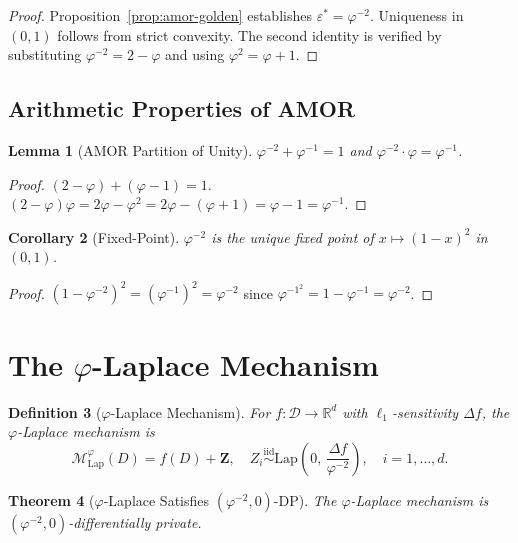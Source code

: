 \documentclass[12pt]{article}
\newtheorem{theorem}{Theorem}
\newtheorem{lemma}[theorem]{Lemma}
\newtheorem{corollary}[theorem]{Corollary}
\newtheorem{definition}[theorem]{Definition}
\newcommand{\AMOR}{\varphi^{-2}}
\newcommand{\PHI}{\varphi}
\newcommand{\PHIINV}{\varphi^{-1}}
\newcommand{\Lap}{\mathrm{Lap}}
\newcommand{\eps}{\varepsilon}
\newcommand{\Mech}{\mathcal{M}}
\newcommand{\DB}{\mathcal{D}}
\newcommand{\R}{\mathbb{R}}
\newcommand{\Sens}{\Delta}
\begin{document}
\begin{proof}
Proposition~\ref{prop:amor-golden} establishes $\eps^* = \AMOR$.  Uniqueness in
$(0,1)$ follows from strict convexity.  The second identity is verified by
substituting $\AMOR = 2 - \PHI$ and using $\PHI^2 = \PHI + 1$.
\end{proof}

\subsection{Arithmetic Properties of AMOR}

\begin{lemma}[AMOR Partition of Unity]
\label{lem:partition}
$\AMOR + \PHIINV = 1$ and $\AMOR \cdot \PHI = \PHIINV$.
\end{lemma}

\begin{proof}
$(2-\PHI) + (\PHI-1) = 1$.  $(2-\PHI)\PHI = 2\PHI - \PHI^2 = 2\PHI -
(\PHI+1) = \PHI - 1 = \PHIINV$.
\end{proof}

\begin{corollary}[Fixed-Point]
\label{cor:fixed}
$\AMOR$ is the unique fixed point of $x \mapsto (1-x)^2$ in $(0,1)$.
\end{corollary}

\begin{proof}
$(1-\AMOR)^2 = (\PHIINV)^2 = \AMOR$ since $\PHIINV^2 = 1 - \PHIINV = \AMOR$.
\end{proof}

\section{The $\varphi$-Laplace Mechanism}
\label{sec:phi-laplace}

\begin{definition}[$\varphi$-Laplace Mechanism]
\label{def:phi-lap}
For $f : \DB \to \R^d$ with $\ell_1$-sensitivity $\Sens f$, the
\emph{$\varphi$-Laplace mechanism} is
\[
  \Mech_\Lap^\PHI(D) = f(D) + \mathbf{Z},
  \quad Z_i \overset{\mathrm{iid}}{\sim} \Lap\!\left(0,\, \frac{\Sens f}{\AMOR}\right),
  \quad i = 1,\ldots,d.
\]
\end{definition}

\begin{theorem}[$\varphi$-Laplace Satisfies $(\AMOR,0)$-DP]
\label{thm:phi-lap-dp}
The $\varphi$-Laplace mechanism is $(\AMOR, 0)$-differentially private.
\end{theorem}
\end{document}
